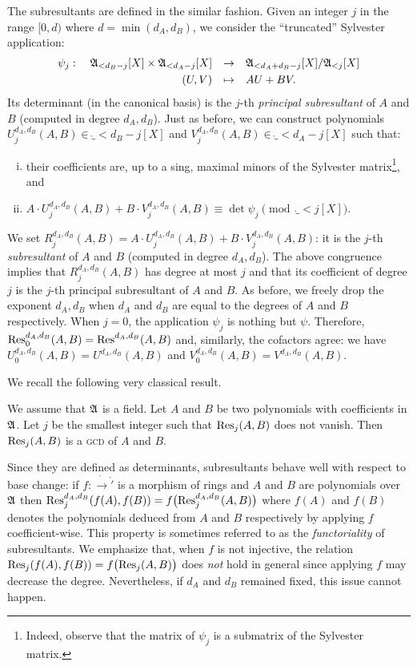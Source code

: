 \documentclass{article}
\begin{document}
The subresultants are defined in the similar fashion. Given an
integer $j$ in the range $[0, d)$ where $d = \min(d_A, d_B)$, we
consider the ``truncated'' Sylvester application:
$$\begin{array}{rcl}
\psi_j : \quad
\ring_{< d_B-j}[X] \times \ring_{< d_A-j}[X] & \to &
\ring_{< d_A+d_B-j}[X]/\ring_{< j}[X] \smallskip \\
(U,V) & \mapsto & AU + BV.
\end{array}$$
Its determinant (in the canonical basis) is the $j$-th \emph{principal 
subresultant} of $A$ and $B$ (computed in degree $d_A, d_B$). Just 
as before, we can construct polynomials $U_j^{d_A, d_B}(A,B) \in
\ring_{< d_B-j}[X]$ and $V_j^{d_A, d_B}(A,B) \in \ring_{< d_A-j}[X]$
such that:
\begin{enumerate}[i)]
\item their coefficients are, up to a sing, maximal minors of the 
Sylvester matrix\footnote{Indeed, observe that the matrix of $\psi_j$ is a
submatrix of the Sylvester matrix.}, and
\item $A \cdot U_j^{d_A, d_B}(A,B) + B \cdot V_j^{d_A, d_B}(A,B) 
\equiv \det \psi_j \pmod {\ring_{< j}[X]}$.
\end{enumerate}
We set $R_j^{d_A, d_B}(A,B) = A \cdot U_j^{d_A, d_B}(A,B) + B \cdot 
V_j^{d_A, d_B}(A,B)$: it is the $j$-th \emph{subresultant} of $A$
and $B$ (computed in degree $d_A, d_B$). The above congruence implies
that $R_j^{d_A, d_B}(A,B)$ has degree at most $j$ and that its
coefficient of degree $j$ is the $j$-th principal subresultant of $A$
and $B$. As before, we freely drop the exponent $d_A, d_B$ when
$d_A$ and $d_B$ are equal to the degrees of $A$ and $B$ respectively.
When $j=0$, the application $\psi_j$ is nothing but $\psi$. Therefore,
$\text{\rm Res}_0^{d_A, d_B}(A,B) = \text{\rm Res}^{d_A, d_B}(A,B)$ and, similarly, the
cofactors agree: we have $U_0^{d_A, d_B}(A,B) = U^{d_A, d_B}(A,B)$
and $V_0^{d_A, d_B}(A,B) = V^{d_A, d_B}(A,B)$.

We recall the following very classical result.

\begin{theo}
We assume that $\mathfrak A$ is a field. Let $A$ and $B$ be two polynomials
with coefficients in $\mathfrak A$. Let $j$ be the smallest integer such
that $\text{\rm Res}_j(A,B)$ does not vanish. Then $\text{\rm Res}_j(A,B)$ is a \textsc{gcd}
of $A$ and $B$.
\end{theo}

Since they are defined as determinants, subresultants behave well with 
respect to base change: if $f : \ring \to \ring'$ is a morphism of rings 
and $A$ and $B$ are polynomials over $\mathfrak A$ then $\text{\rm Res}_j^{d_A,d_B} 
(f(A),f(B)) = f\big(\text{\rm Res}_j^{d_A,d_B}(A,B)\big)$ where $f(A)$ and $f(B)$ 
denotes the polynomials deduced from $A$ and $B$ respectively by 
applying $f$ coefficient-wise. This property is sometimes referred to as 
the \emph{functoriality} of subresultants.
We emphasize that, when $f$ is not injective, the relation 
$\text{\rm Res}_j(f(A),f(B)) = f\big(\text{\rm Res}_j(A,B)\big)$ does \emph{not} hold in 
general since applying $f$ may decrease the degree. Nevertheless, if
$d_A$ and $d_B$ remained fixed, this issue cannot happen.
\end{document}
